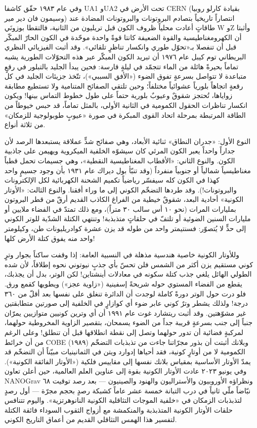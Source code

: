\documentclass[12pt,a4paper,openany]{book}
\begin{document}
وفي عام ١٩٨٣ حقّق كاشفا UA1 وUA2 تحت الأرض في CERN (بقيادة كارلو روبيا وسيمون فان دير مير) انتصاراً تاريخياً بتصادم البروتونات والبروتونات المضادة عند طاقاتٍ أعادت محلياً ظروف الكون قبل تريليون من الثانية، فالتقطا بوزونَي W وZ وأثبتا أن الكهرومغناطيسية والقوة الضعيفة كانتا قوةً واحدة موحّدة في الكون الحارّ المبكّر قبل أن تنفصلا بـ«تحوّل طوري وانكسار تناظرٍ تلقائي». وقد أثبت الفيزيائي النظري البريطاني توم كيبل عام ١٩٧٦ أن تبريد الكون المبكّر عبر هذه التحوّلات الطورية يشبه تماماً بحيرةً هائلة من الماء تتجمّد في ليلةٍ قارسة: فحين يبدأ الجليد بالتبلور في رقعٍ متباعدة لا تتواصل بسرعةٍ تفوق الضوء («الأفق السببي»)، تتّخذ جزيئات الجليد في كل رقعةٍ اتجاهاً بلورياً عشوائياً مختلفاً؛ وحين تلتقي الصفائح المتنامية ولا تستطيع مطابقة زواياها، تُحتجز شقوقٌ وعيوبٌ بلورية حتماً على طول خطوط التماس بينها! ويكون انكسار تناظرات الحقول الكمومية في الثانية الأولى، بالمثل تماماً، قد حبس خيوطاً من الطاقة المرتبطة بمرحلة اتحاد القوى المبكرة في صورة «عيوبٍ طوبولوجية للزمكان» من ثلاثة أنواع.


النوع الأول: «جدران النطاق» ثنائية الأبعاد، وهي صفائح شدٍّ عملاقة يستبعدها الرصد لأن جداراً واحداً يعبر الكون المرئي كان سيشوّه الخلفية الميكروية ويهيمن على جاذبية الكون. والنوع الثاني: «الأقطاب المغناطيسية النقطية»، وهي جسيمات تحمل قطباً مغناطيسياً شمالياً أو جنوبياً منفرداً (وقد تنبّأ بول ديراك عام ١٩٣١ بأن وجود جسيمٍ واحد كهذا في الكون كله سيفسّر رياضياً تكميم الشحنة الكهربائية لكل الإلكترونات والبروتونات!). وقد طردها التضخّم الكوني إلى ما وراء أفقنا. والنوع الثالث: «الأوتار الكونية» أحادية البعد، شقوقٌ خيطية من الفراغ الكاذب القديم أرقّ من قطر البروتون بمليارات المرات (نحو ١٠ أس سالب ٣٠ متراً)، ومع ذلك تمتدّ في الفضاء ملايين أو مليارات السنين الضوئية أو تلتفّ في حلقاتٍ متذبذبة! وتنتهي الكتلة الشدّية للوتر الكوني إلى حدٍّ لا يُتصوّر: فسنتيمتر واحد من طوله قد يزن عشرة كوادريليونات طن، وكيلومتر واحد منه يفوق كتلة الأرض كلها!


وللأوتار الكونية خاصية هندسية مذهلة في النسبية العامة: إذا وقفت ساكناً بجوار وترٍ كوني مستقيم يزن أكثر من الشمس فلن تحسّ بأي جذبٍ نيوتوني نحوه إطلاقاً، لأن شده الطولي الهائل يلغي جذب كتلة سكونه في معادلات أينشتاين! لكن الوتر، بدل أن يجذبك، يقطع من الفضاء المستوي حوله شريحةً إسفينية («زاوية عجز») ويطويها كقمع ورق. فلو درت حول الوتر دورةً كاملة لوجدت أن الدائرة تنغلق على نفسها بعد أقلّ من ٣٦٠ درجة! ولذلك يشطر وترٌ كوني عابر ضوء أي كوازارٍ في الخلفية إلى صورتين متطابقتين غير مشوّهتين. وقد أثبت ريتشارد غوت عام ١٩٩١ أن أي وترين كونيين متوازيين يمرّان جنباً إلى جنب بسرعةٍ قريبة جداً من الضوء يسمحان، بتقصير الزاوية المخروطية حولهما، لمركبةٍ فضائية أن تدور حولهما وتصل إلى نقطة انطلاقها قبل أن تنطلق! وعلى الرغم من أن خرائط COBE (١٩٨٩) وبلانك أثبتت أن بذور مجرّاتنا جاءت من تذبذبات التضخّم الكمومية لا من أوتارٍ كونية، فقد أحياها إدوارد ويتن في الثمانينيات مبيّناً أن التضخّم قد يمدّ الأوتار الأساسية بمقياس بلانك نفسها إلى مقاييس فلكية («الأوتار الفائقة الكونية»). وفي يونيو ٢٠٢٣ عادت الأوتار الكونية بقوة إلى عناوين العلم العالمية، حين أعلن تعاون NANOGrav ونظراؤه الأوروبيون والأستراليون والهنود والصينيون — بعد رصد توقيت ٦٨ نبّاضاً ملّي ثانياً في درب التبانة خمسة عشر عاماً كشبكة رصدٍ بحجم مجرّة — أول رصدٍ لتذبذبات الزمكان في «خلفية الموجات التثاقلية الكونية النانوهرتزية». واليوم تتنافس حلقات الأوتار الكونية المتذبذبة والمنكمشة مع أزواج الثقوب السوداء فائقة الكتلة لتفسير هذا الهمس التثاقلي القديم من أعماق التاريخ الكوني.
\end{document}
